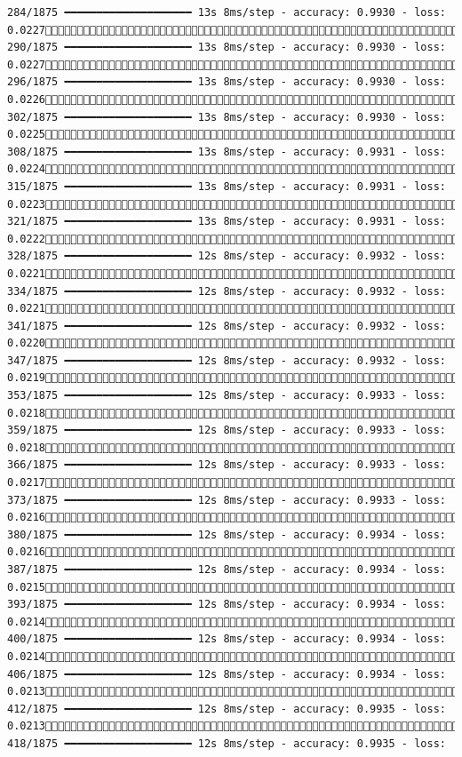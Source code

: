 \documentclass[
  letterpaper,
  DIV=11,
  numbers=noendperiod]{scrreprt}
\begin{document}
\begin{verbatim}
284/1875 ━━━━━━━━━━━━━━━━━━━━ 13s 8ms/step - accuracy: 0.9930 - loss: 0.0227 290/1875 ━━━━━━━━━━━━━━━━━━━━ 13s 8ms/step - accuracy: 0.9930 - loss: 0.0227 296/1875 ━━━━━━━━━━━━━━━━━━━━ 13s 8ms/step - accuracy: 0.9930 - loss: 0.0226 302/1875 ━━━━━━━━━━━━━━━━━━━━ 13s 8ms/step - accuracy: 0.9930 - loss: 0.0225 308/1875 ━━━━━━━━━━━━━━━━━━━━ 13s 8ms/step - accuracy: 0.9931 - loss: 0.0224 315/1875 ━━━━━━━━━━━━━━━━━━━━ 13s 8ms/step - accuracy: 0.9931 - loss: 0.0223 321/1875 ━━━━━━━━━━━━━━━━━━━━ 13s 8ms/step - accuracy: 0.9931 - loss: 0.0222 328/1875 ━━━━━━━━━━━━━━━━━━━━ 12s 8ms/step - accuracy: 0.9932 - loss: 0.0221 334/1875 ━━━━━━━━━━━━━━━━━━━━ 12s 8ms/step - accuracy: 0.9932 - loss: 0.0221 341/1875 ━━━━━━━━━━━━━━━━━━━━ 12s 8ms/step - accuracy: 0.9932 - loss: 0.0220 347/1875 ━━━━━━━━━━━━━━━━━━━━ 12s 8ms/step - accuracy: 0.9932 - loss: 0.0219 353/1875 ━━━━━━━━━━━━━━━━━━━━ 12s 8ms/step - accuracy: 0.9933 - loss: 0.0218 359/1875 ━━━━━━━━━━━━━━━━━━━━ 12s 8ms/step - accuracy: 0.9933 - loss: 0.0218 366/1875 ━━━━━━━━━━━━━━━━━━━━ 12s 8ms/step - accuracy: 0.9933 - loss: 0.0217 373/1875 ━━━━━━━━━━━━━━━━━━━━ 12s 8ms/step - accuracy: 0.9933 - loss: 0.0216 380/1875 ━━━━━━━━━━━━━━━━━━━━ 12s 8ms/step - accuracy: 0.9934 - loss: 0.0216 387/1875 ━━━━━━━━━━━━━━━━━━━━ 12s 8ms/step - accuracy: 0.9934 - loss: 0.0215 393/1875 ━━━━━━━━━━━━━━━━━━━━ 12s 8ms/step - accuracy: 0.9934 - loss: 0.0214 400/1875 ━━━━━━━━━━━━━━━━━━━━ 12s 8ms/step - accuracy: 0.9934 - loss: 0.0214 406/1875 ━━━━━━━━━━━━━━━━━━━━ 12s 8ms/step - accuracy: 0.9934 - loss: 0.0213 412/1875 ━━━━━━━━━━━━━━━━━━━━ 12s 8ms/step - accuracy: 0.9935 - loss: 0.0213 418/1875 ━━━━━━━━━━━━━━━━━━━━ 12s 8ms/step - accuracy: 0.9935 - loss: 
\end{verbatim}
\end{document}
